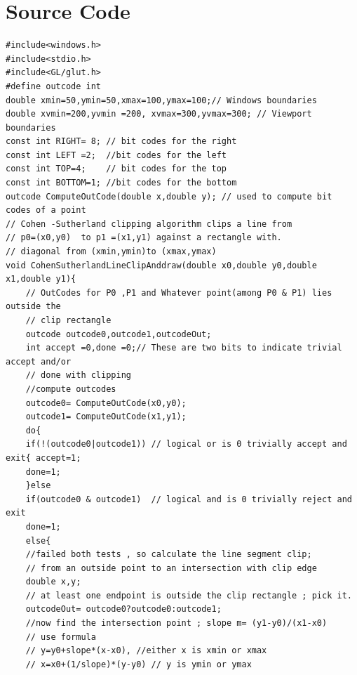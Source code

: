 \documentclass[11pt]{report}
\begin{document}
\section{Source Code}
\begin{lstlisting}
#include<windows.h>
#include<stdio.h>
#include<GL/glut.h>
#define outcode int
double xmin=50,ymin=50,xmax=100,ymax=100;// Windows boundaries
double xvmin=200,yvmin =200, xvmax=300,yvmax=300; // Viewport boundaries
const int RIGHT= 8; // bit codes for the right
const int LEFT =2;  //bit codes for the left
const int TOP=4;    // bit codes for the top
const int BOTTOM=1; //bit codes for the bottom
outcode ComputeOutCode(double x,double y); // used to compute bit codes of a point
// Cohen -Sutherland clipping algorithm clips a line from
// p0=(x0,y0)  to p1 =(x1,y1) against a rectangle with.
// diagonal from (xmin,ymin)to (xmax,ymax)
void CohenSutherlandLineClipAnddraw(double x0,double y0,double x1,double y1){
	// OutCodes for P0 ,P1 and Whatever point(among P0 & P1) lies outside the
	// clip rectangle
	outcode outcode0,outcode1,outcodeOut;
	int accept =0,done =0;// These are two bits to indicate trivial accept and/or
	// done with clipping
	//compute outcodes
	outcode0= ComputeOutCode(x0,y0);
	outcode1= ComputeOutCode(x1,y1);
	do{
	if(!(outcode0|outcode1)) // logical or is 0 trivially accept and exit{ accept=1;
	done=1;
	}else
	if(outcode0 & outcode1)  // logical and is 0 trivially reject and exit
	done=1;
	else{
	//failed both tests , so calculate the line segment clip;
	// from an outside point to an intersection with clip edge
	double x,y;
	// at least one endpoint is outside the clip rectangle ; pick it.
	outcodeOut= outcode0?outcode0:outcode1;
	//now find the intersection point ; slope m= (y1-y0)/(x1-x0)
	// use formula
	// y=y0+slope*(x-x0), //either x is xmin or xmax
	// x=x0+(1/slope)*(y-y0) // y is ymin or ymax
	

\end{lstlisting}
\end{document}
